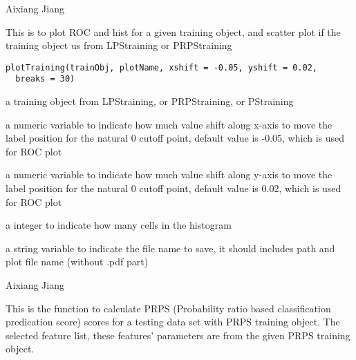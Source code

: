 \documentclass[letterpaper]{book}
\begin{document}
%
\begin{Author}\relax
Aixiang Jiang
\end{Author}
%
\begin{Description}\relax
This is to plot ROC and hist for a given training object, and scatter plot if the training object us from LPStraining or PRPStraining
\end{Description}
%
\begin{Usage}
\begin{verbatim}
plotTraining(trainObj, plotName, xshift = -0.05, yshift = 0.02,
  breaks = 30)
\end{verbatim}
\end{Usage}
%
\begin{Arguments}
\begin{ldescription}
\item[\code{trainObj}] a training object from LPStraining, or PRPStraining, or PStraining

\item[\code{xshift}] a numeric variable to indicate how much value shift along x-axis to move the label position for the natural 0 cutoff point,
default value is -0.05, which is used for ROC plot

\item[\code{yshift}] a numeric variable to indicate how much value shift along y-axis to move the label position for the natural 0 cutoff point,
default value is 0.02, which is used for ROC plot

\item[\code{breaks}] a integer to indicate how many cells in the histogram

\item[\code{plotNanme}] a string variable to indicate the file name to save, it should includes path and plot file name (without .pdf part)
\end{ldescription}
\end{Arguments}
%
\begin{Author}\relax
Aixiang Jiang
\end{Author}
%
\begin{Description}\relax
This is the function to calculate PRPS (Probability ratio based classification predication score)
scores for a testing data set with PRPS training object. The selected feature list, 
these features' parameters are from the given PRPS training object.
\end{Description}
\end{document}
